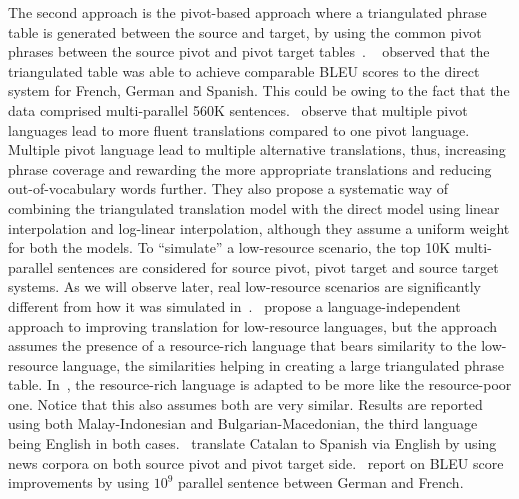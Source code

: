 The second approach is the pivot-based approach where a triangulated phrase table is generated between the source and target, by using the common pivot phrases between the source pivot and pivot target tables~\cite{Utiyama:07,Cohn:07}.
 ~\cite{Utiyama:07} observed that the triangulated table was able to achieve comparable BLEU scores to the direct system for French, German and Spanish. This could be owing to the fact that the data comprised multi-parallel 560K sentences.~\cite{Cohn:07} observe that multiple pivot languages lead to more fluent translations compared to one pivot language. Multiple pivot language lead to multiple alternative translations, thus, increasing phrase coverage and rewarding the more appropriate translations and reducing out-of-vocabulary words further. They also propose a systematic way of combining the triangulated translation model with the direct model using linear interpolation and log-linear interpolation, although they assume a uniform weight for both the models. To ``simulate'' a low-resource scenario, the top 10K multi-parallel sentences are considered for source pivot, pivot target and source target systems. As we will observe later, real low-resource scenarios are significantly different from how it was simulated in~\cite{Cohn:07}.~\cite{Nakov:12} propose a language-independent approach to improving translation for low-resource languages, but the approach assumes the presence of a resource-rich language that bears similarity to the low-resource language, the similarities helping in creating a large triangulated phrase table. In~\cite{Nakovemnlp:12}, the resource-rich language is adapted to be more like the resource-poor one. Notice that this also assumes both are very similar. Results are reported using both Malay-Indonesian and Bulgarian-Macedonian, the third language being English in both cases.~\cite{Gispert:06} translate Catalan to Spanish via English by using news corpora on both source pivot and pivot target side.~\cite{Huck:12} report on BLEU score improvements by using $10^9$ parallel sentence between German and French.

